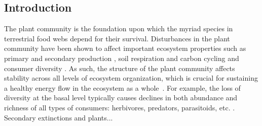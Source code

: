 \documentclass[12pt]{article}
\begin{document}
\begin{spacing}{2.0}

\clearpage
\section*{Introduction} %

     The plant community is the foundation upon which the myriad species in terrestrial food webs depend for their survival. Disturbances in the plant community have been shown to affect important ecosystem properties such as primary \citep{Hector1999} and secondary production \citep{borer2012plant}, soil respiration and carbon cycling \citep{chen2019plant} and consumer diversity \citep{scherber2010bottom, Baiser2016}.
     As such, the structure of the plant community affects stability across all levels of ecosystem organization, which is crucial for sustaining a healthy energy flow in the ecosystem as a whole~\citep{proulx2010diversity, scherber2010bottom, Rosenblatt2016}. 
     For example, the loss of diversity at the basal level typically causes declines in both abundance and richness of all types of consumers: herbivores, predators, parasitoids, etc. \citep{scherber2010bottom}. Secondary extinctions and plants...



\end{spacing}
\end{document}

